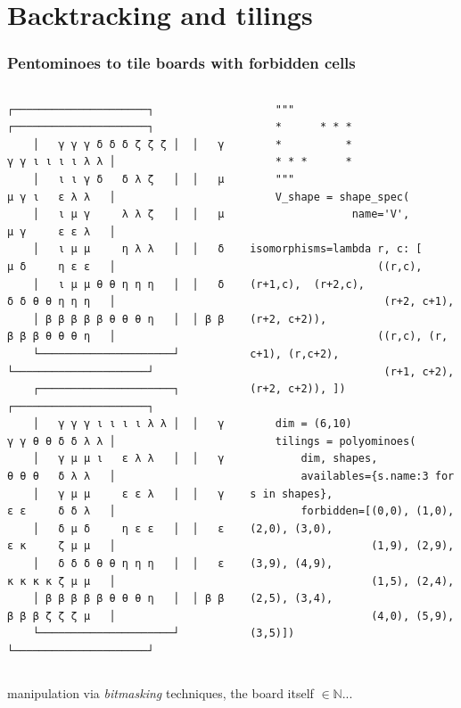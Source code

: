 \documentclass[9pt]{beamer}
\begin{document}
\section{Backtracking and tilings}

\begin{frame}[fragile]
\frametitle{Pentominoes to tile boards with forbidden cells}
\begin{columns}
    \begin{column}{0.5\textwidth}  %
    \begin{Verbatim}[baselinestretch=0.1, fontsize=\footnotesize]
    ┌─────────────────────┐  ┌─────────────────────┐
    │   γ γ γ δ δ δ ζ ζ ζ │  │   γ γ γ ι ι ι ι λ λ │
    │   ι ι γ δ   δ λ ζ   │  │   μ μ γ ι   ε λ λ   │
    │   ι μ γ     λ λ ζ   │  │   μ μ γ     ε ε λ   │
    │   ι μ μ     η λ λ   │  │   δ μ δ     η ε ε   │
    │   ι μ μ θ θ η η η   │  │   δ δ δ θ θ η η η   │
    │ β β β β β θ θ θ η   │  │ β β β β β θ θ θ η   │
    └─────────────────────┘  └─────────────────────┘
    ┌─────────────────────┐  ┌─────────────────────┐
    │   γ γ γ ι ι ι ι λ λ │  │   γ γ γ θ θ δ δ λ λ │
    │   γ μ μ ι   ε λ λ   │  │   γ θ θ θ   δ λ λ   │
    │   γ μ μ     ε ε λ   │  │   γ ε ε     δ δ λ   │
    │   δ μ δ     η ε ε   │  │   ε ε κ     ζ μ μ   │
    │   δ δ δ θ θ η η η   │  │   ε κ κ κ κ ζ μ μ   │
    │ β β β β β θ θ θ η   │  │ β β β β β ζ ζ ζ μ   │
    └─────────────────────┘  └─────────────────────┘
    \end{Verbatim}
    \end{column}
    \begin{column}{0.5\textwidth}  %
    \begin{verbatim}
    """
    *      * * *
    *          *
    * * *      *
    """
    V_shape = shape_spec(
                name='V',
                isomorphisms=lambda r, c: [
                    ((r,c), (r+1,c),  (r+2,c),
                     (r+2, c+1), (r+2, c+2)),
                    ((r,c), (r, c+1), (r,c+2),
                     (r+1, c+2), (r+2, c+2)), ])

    dim = (6,10)
    tilings = polyominoes(
        dim, shapes,
        availables={s.name:3 for s in shapes},
        forbidden=[(0,0), (1,0), (2,0), (3,0),
                   (1,9), (2,9), (3,9), (4,9),
                   (1,5), (2,4), (2,5), (3,4),
                   (4,0), (5,9), (3,5)])
    \end{verbatim}
    \end{column}
\end{columns}
manipulation via \textit{bitmasking} techniques, the board itself $\in\mathbb{N}$...
\end{frame}
\end{document}
